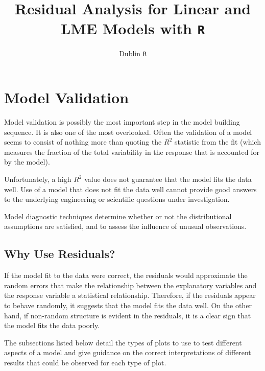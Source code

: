 \documentclass[12pt, a4paper]{article}
\title{Residual Analysis for Linear and LME Models with \texttt{R}}
\author{Dublin \texttt{R}}
\theoremstyle{plain}
\theoremstyle{definition}
\theoremstyle{remark}
\begin{document}
\maketitle

\tableofcontents
\newpage
\section{Model Validation}
Model validation is possibly the most important step in the model building sequence. It is also one of the most overlooked. Often the validation of a model seems to consist of nothing more than quoting the $R^2$ statistic from the fit (which measures the fraction of the total variability in the response that is accounted for by the model). 

Unfortunately, a high $R^2$ value does not guarantee that the model fits the data well. Use of a model that does not fit the data well cannot provide good answers to the underlying engineering or scientific questions under investigation.



Model diagnostic techniques determine whether or not the distributional assumptions are satisfied, and to assess the influence of unusual observations.


\subsection{Why Use Residuals?}

If the model fit to the data were correct, the residuals would approximate the random errors that make the relationship between the explanatory variables and the response variable a statistical relationship. Therefore, if the residuals appear to behave randomly, it suggests that the model fits the data well. On the other hand, if non-random structure is evident in the residuals, it is a clear sign that the model fits the data poorly. 

The subsections listed below detail the types of plots to use to test different aspects of a model and give guidance on the correct interpretations of different results that could be observed for each type of plot.
%
%
%
\end{document}
